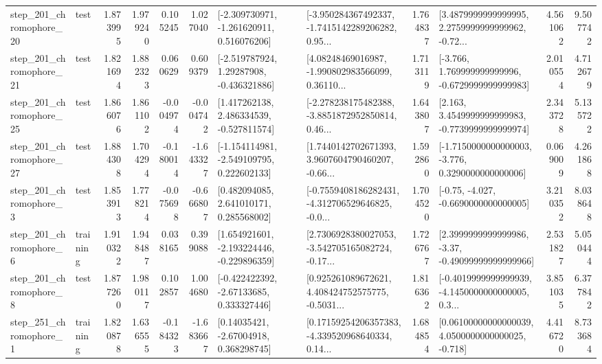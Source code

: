 \begin{tabular}{llrrrrllrlrr}
  step\_201\_chromophore\_20 &      test &      1.873995 &    1.979240 &      0.105245 &  1.027040 &   [-2.309730971, -1.261620911, 0.516076206] &  [-3.950284367492337, -1.7415142289206282, 0.95... &       1.764837 &  [3.4879999999999995, 2.2759999999999962, -0.72... &            4.561062 &          9.507742 \\
  step\_201\_chromophore\_21 &      test &      1.821694 &    1.882323 &      0.060629 &  0.609379 &    [-2.519787924, 1.29287908, -0.436321886] &  [4.08248469016987, -1.990802983566099, 0.36110... &       1.713119 &   [-3.766, 1.769999999999996, -0.6729999999999983] &            2.010554 &          4.712679 \\
  step\_201\_chromophore\_25 &      test &      1.866076 &    1.861102 &     -0.004974 & -0.004742 &    [1.417262138, 2.486334539, -0.527811574] &  [-2.278238175482388, -3.8851872952850814, 0.46... &       1.643807 &   [2.163, 3.4549999999999983, -0.7739999999999974] &            2.343728 &          5.135722 \\
  step\_201\_chromophore\_27 &      test &      1.884308 &    1.704294 &     -0.180014 & -1.643327 &   [-1.154114981, -2.549109795, 0.222602133] &  [1.7440142702671393, 3.9607604790460207, -0.66... &       1.592860 &  [-1.7150000000000003, -3.776, 0.3290000000000006] &            0.069009 &          4.261868 \\
   step\_201\_chromophore\_3 &      test &      1.853913 &    1.778214 &     -0.075698 & -0.666807 &     [0.482094085, 2.641010171, 0.285568002] &  [-0.7559408186282431, -4.312706529646825, -0.0... &       1.704520 &               [-0.75, -4.027, -0.6690000000000005] &            3.210352 &          8.038648 \\
   step\_201\_chromophore\_6 &  training &      1.910322 &    1.948487 &      0.038165 &  0.399088 &   [1.654921601, -2.193224446, -0.229896359] &  [2.7306928380027053, -3.542705165082724, -0.17... &       1.726767 &  [2.3999999999999986, -3.37, -0.49099999999999966] &            2.531827 &          5.050444 \\
   step\_201\_chromophore\_8 &      test &      1.877260 &    1.980117 &      0.102857 &  1.004680 &    [-0.422422392, -2.67133685, 0.333327446] &  [0.925261089672621, 4.408424752575775, -0.5031... &       1.816362 &  [-0.4019999999999939, -4.1450000000000005, 0.3... &            3.851035 &          6.377842 \\
   step\_251\_chromophore\_1 &  training &      1.820878 &    1.636555 &     -0.184323 & -1.683667 &      [0.14035421, -2.67004918, 0.368298745] &  [0.17159254206357383, -4.339520968640334, 0.14... &       1.684854 &  [0.06100000000000039, 4.0500000000000025, -0.718] &            4.416720 &          8.733684 \\

\end{tabular}
